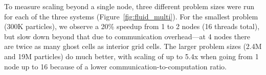 To measure scaling beyond a single node, three different problem sizes
were run for each of the three systems (Figure~\ref{fig:fluid_multi}).
For the smallest problem (300K particles), we observe a 20\% speedup
from 1 to 2 nodes (16 threads total), but slow
down beyond that due to communication overhead---at 4 nodes there are
twice as many ghost cells as interior grid cells.  The larger problem
sizes (2.4M and 19M particles) do much better, with scaling of up to
5.4x when going from 1 node up to 16 because of a lower
communication-to-computation ratio.


